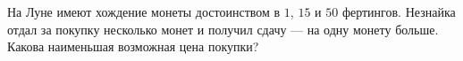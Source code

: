 На Луне имеют хождение монеты достоинством в $1$, $15$ и $50$ фертингов. Незнайка отдал за покупку несколько монет и получил сдачу --- на одну монету больше. Какова наименьшая возможная цена покупки?